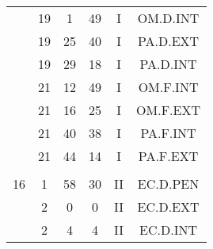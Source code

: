\documentclass[12pt, a4paper]{article}
\begin{document}
\begin{multicols}{3}
{\begin{tabular}{c c c c c c}
	 	 	 	 & 19 & 1 & 49 & I & OM.D.INT\\%
	 	 	 	 & 19 & 25 & 40 & I & PA.D.EXT\\%
	 	 	 	 & 19 & 29 & 18 & I & PA.D.INT\\%
	 	 	 	 & 21 & 12 & 49 & I & OM.F.INT\\%
	 	 	 	 & 21 & 16 & 25 & I & OM.F.EXT\\%
	 	 	 	 & 21 & 40 & 38 & I & PA.F.INT\\%
	 	 	 	 & 21 & 44 & 14 & I & PA.F.EXT\\%
	 	 	 	 & & & & & \\%
	 	 	 	16 & 1 & 58 & 30 & II & EC.D.PEN\\%
	 	 	 	 & 2 & 0 & 0 & II & EC.D.EXT\\%
	 	 	 	 & 2 & 4 & 4 & II & EC.D.INT\\%
	 	 \end{tabular}
 	}
\end{multicols}
\end{document}
